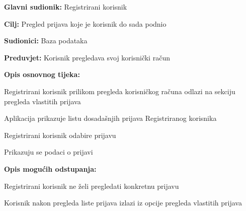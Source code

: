 				
				\noindent {}
				\begin{packed_item}
					
					\item \textbf{Glavni sudionik:} Registrirani korisnik
					\item  \textbf{Cilj:} Pregled prijava koje je korisnik do sada podnio
					\item  \textbf{Sudionici:} Baza podataka
					\item  \textbf{Preduvjet:} Korisnik pregledava svoj korisnički račun
					
					\item  \textbf{Opis osnovnog tijeka:}
					\item[] \begin{packed_enum}
						\item Registrirani korisnik prilikom pregleda korisničkog računa odlazi na sekciju pregleda vlastitih prijava
						\item Aplikacija prikazuje listu dosadašnjih prijava Registriranog korisnika
						\item Registrirani korisnik odabire prijavu
						\item Prikazuju se podaci o prijavi
					\end{packed_enum}
					
					\item  \textbf{Opis mogućih odstupanja:}
					\item[] \begin{packed_item}						
						\item[3.a] Registrirani korisnik ne želi pregledati konkretnu prijavu
						\item[] \begin{packed_enum}
							\item Korisnik nakon pregleda liste prijava izlazi iz opcije pregleda vlastitih prijava
						\end{packed_enum}
					\end{packed_item}
				\end{packed_item}
				
